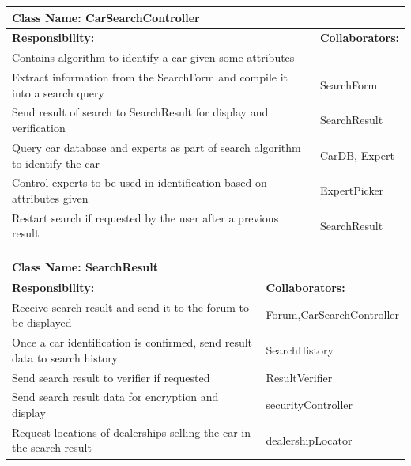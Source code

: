 \documentclass[12pt]{article}
\begin{document}
	\begin{table}[ht]
		\centering
		\begin{tabular}{|p{5cm}|p{5cm}|}
		\hline
		 \multicolumn{2}{|l|}{\textbf{Class Name:} CarSearchController} \\
		\hline
		\textbf{Responsibility:} & \textbf{Collaborators:} \\
		\hline
		Contains algorithm to identify a car given some attributes & -\\
		\hline
	    Extract information from the SearchForm and compile it into a search query & SearchForm\\
	    \hline
	    Send result of search to SearchResult for display and verification & SearchResult\\
	    \hline
	    Query car database and experts as part of search algorithm to identify the car & CarDB, Expert\\
	    \hline
	    Control experts to be used in identification based on attributes given & ExpertPicker\\
		\hline
		Restart search if requested by the user after a previous result & SearchResult\\
		\hline
		\end{tabular}
	\end{table}

	\begin{table}[ht]
		\centering
		\begin{tabular}{|p{5cm}|p{5cm}|}
		\hline
		 \multicolumn{2}{|l|}{\textbf{Class Name:} SearchResult} \\
		\hline
		\textbf{Responsibility:} & \textbf{Collaborators:} \\
		\hline
		Receive search result and send it to the forum to be displayed  & Forum,CarSearchController\\
		\hline
		Once a car identification is confirmed, send result data to search history & SearchHistory\\
		\hline
		Send search result to verifier if requested & ResultVerifier\\
		\hline
		Send search result data for encryption and display & securityController\\
		\hline
		Request locations of dealerships selling the car in the search result & dealershipLocator\\
		\hline
		\end{tabular}
	\end{table}
\end{document}
